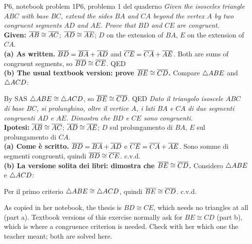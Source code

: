\begin{proofbox}{P6, notebook problem 1}{P6, problema 1 del quaderno}
\emph{Given the isosceles triangle $ABC$ with base $BC$, extend the sides $BA$ and $CA$ beyond the vertex $A$ by two congruent segments $AD$ and $AE$. Prove that $BD$ and $CE$ are congruent.}\\
\textbf{Given:} $\overline{AB} \cong \overline{AC}$; $\overline{AD} \cong \overline{AE}$; $D$ on the extension of $BA$, $E$ on the extension of $CA$.\\
\textbf{(a) As written.} $\overline{BD} = \overline{BA} + \overline{AD}$ and $\overline{CE} = \overline{CA} + \overline{AE}$. Both are sums of congruent segments, so $\overline{BD} \cong \overline{CE}$. \hfill QED\\
\textbf{(b) The usual textbook version: prove $\overline{BE} \cong \overline{CD}$.} Compare $\triangle ABE$ and $\triangle ACD$:
\begin{steps}
\end{steps}
By SAS $\triangle ABE \cong \triangle ACD$, so $\overline{BE} \cong \overline{CD}$. \hfill QED
\tcblower
\emph{Dato il triangolo isoscele $ABC$ di base $BC$, si prolunghino, oltre il vertice $A$, i lati $BA$ e $CA$ di due segmenti congruenti $AD$ e $AE$. Dimostra che $BD$ e $CE$ sono congruenti.}\\
\textbf{Ipotesi:} $\overline{AB} \cong \overline{AC}$; $\overline{AD} \cong \overline{AE}$; $D$ sul prolungamento di $BA$, $E$ sul prolungamento di $CA$.\\
\textbf{(a) Come è scritto.} $\overline{BD} = \overline{BA} + \overline{AD}$ e $\overline{CE} = \overline{CA} + \overline{AE}$. Sono somme di segmenti congruenti, quindi $\overline{BD} \cong \overline{CE}$. \hfill c.v.d.\\
\textbf{(b) La versione solita dei libri: dimostra che $\overline{BE} \cong \overline{CD}$.} Considero $\triangle ABE$ e $\triangle ACD$:
\begin{steps}
\end{steps}
Per il primo criterio $\triangle ABE \cong \triangle ACD$, quindi $\overline{BE} \cong \overline{CD}$. \hfill c.v.d.
\end{proofbox}

\begin{tutor}[about P6]
As copied in her notebook, the thesis is $BD \cong CE$, which needs no triangles at all (part a). Textbook versions of this exercise normally ask for $BE \cong CD$ (part b), which is where a congruence criterion is needed. Check with her which one the teacher meant; both are solved here.
\end{tutor}

